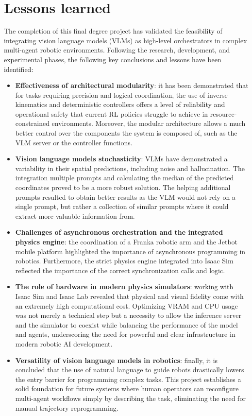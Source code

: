 \section{Lessons learned}
The completion of this final degree project has validated the feasibility of integrating vision language models (VLMs) as high-level orchestrators in complex multi-agent robotic environments. Following the research, development, and experimental phases, the following key conclusions and lessons have been identified:

\begin{itemize}
	\item \textbf{Effectiveness of architectural modularity}: it has been demonstrated that for tasks requiring precision and logical coordination, the use of inverse kinematics and deterministic controllers offers a level of reliability and operational safety that current RL policies struggle to achieve in resource-constrained environments. Moreover, the modular architecture allows a much better control over the components the system is composed of, such as the VLM server or the controller functions. 
	
	\item \textbf{Vision language models stochasticity}: VLMs have demonstrated a variability in their spatial predictions, including noise and hallucination. The integration multiple prompts and calculating the median of the predicted coordinates proved to be a more robust solution. The helping additional prompts resulted to obtain better results as the VLM would not rely on a single prompt, but rather a collection of similar prompts where it could extract more valuable information from. 
	
	\item \textbf{Challenges of asynchronous orchestration and the integrated physics engine}: the coordination of a Franka robotic arm and the Jetbot mobile platform highlighted the importance of asynchronous programming in robotics.  Furthermore, the strict physics engine integrated into Isaac Sim reflected the importance of the correct synchronization calls and logic. 
	
	\item \textbf{The role of hardware in modern physics simulators}: working with  Isaac Sim and Isaac Lab revealed that physical and visual fidelity come with an extremely high computational cost. Optimizing VRAM and CPU usage was not merely a technical step but a necessity to allow the inference server and the simulator to coexist while balancing the performance of the model and agents, underscoring the need for powerful and clear infrastructure in modern robotic AI development.
	
	\item \textbf{Versatility of vision language models in robotics}: finally, it is concluded that the use of natural language to guide robots drastically lowers the entry barrier for programming complex tasks. This project establishes a solid foundation for future systems where human operators can reconfigure multi-agent workflows simply by describing the task, eliminating the need for manual trajectory reprogramming.
\end{itemize}

